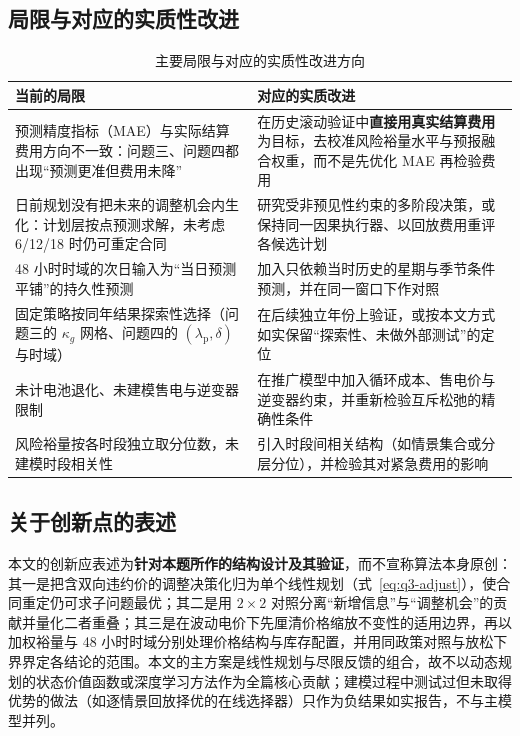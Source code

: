 \subsection{局限与对应的实质性改进}

\begin{table}[htbp]
  \centering
  \caption{主要局限与对应的实质性改进方向}
  \label{tab:limits}
  \small
  \begin{tabularx}{\textwidth}{XX}
    \toprule
    当前的局限 & 对应的实质改进 \\
    \midrule
    预测精度指标（MAE）与实际结算费用方向不一致：问题三、问题四都出现``预测更准但费用未降'' & 在历史滚动验证中\textbf{直接用真实结算费用}为目标，去校准风险裕量水平与预报融合权重，而不是先优化 MAE 再检验费用 \\
    日前规划没有把未来的调整机会内生化：计划层按点预测求解，未考虑 6/12/18 时仍可重定合同 & 研究受非预见性约束的多阶段决策，或保持同一因果执行器、以回放费用重评各候选计划 \\
    48 小时时域的次日输入为``当日预测平铺''的持久性预测 & 加入只依赖当时历史的星期与季节条件预测，并在同一窗口下作对照 \\
    固定策略按同年结果探索性选择（问题三的 $\kappa_g$ 网格、问题四的 $(\lambda_{\mathrm{p}},\delta)$ 与时域） & 在后续独立年份上验证，或按本文方式如实保留``探索性、未做外部测试''的定位 \\
    未计电池退化、未建模售电与逆变器限制 & 在推广模型中加入循环成本、售电价与逆变器约束，并重新检验互斥松弛的精确性条件 \\
    风险裕量按各时段独立取分位数，未建模时段相关性 & 引入时段间相关结构（如情景集合或分层分位），并检验其对紧急费用的影响 \\
    \bottomrule
  \end{tabularx}
\end{table}

\subsection{关于创新点的表述}

本文的创新应表述为\textbf{针对本题所作的结构设计及其验证}，而不宣称算法本身原创：其一是把含双向违约价的调整决策化归为单个线性规划（式~\eqref{eq:q3-adjust}），使合同重定仍可求子问题最优；其二是用 $2\times2$ 对照分离``新增信息''与``调整机会''的贡献并量化二者重叠；其三是在波动电价下先厘清价格缩放不变性的适用边界，再以加权裕量与 48 小时时域分别处理价格结构与库存配置，并用同政策对照与放松下界界定各结论的范围。本文的主方案是线性规划与尽限反馈的组合，故不以动态规划的状态价值函数或深度学习方法作为全篇核心贡献；建模过程中测试过但未取得优势的做法（如逐情景回放择优的在线选择器）只作为负结果如实报告，不与主模型并列。
